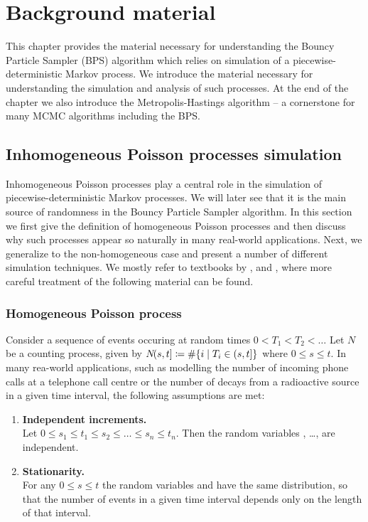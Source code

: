 \documentclass[report.tex]{subfiles}
\begin{document}
\chapter{Background material}

This chapter provides the material necessary for understanding the
Bouncy Particle Sampler (BPS) algorithm which relies on simulation of a
piecewise-deterministic Markov process.
We introduce the material necessary
for understanding the simulation and analysis of such processes.
At the end of the chapter we also introduce the Metropolis-Hastings algorithm
-- a cornerstone for many MCMC algorithms including the BPS.


\section{Inhomogeneous Poisson processes simulation}
\label{background-material-poisson-processes}


Inhomogeneous Poisson processes play a central role in the simulation of
piecewise-deterministic Markov processes. We will later see that it is
the main source of randomness in the Bouncy Particle Sampler algorithm.
In this section we first give the definition of homogeneous Poisson processes
and then discuss why such processes appear so naturally in many real-world applications.
Next, we generalize to the non-homogeneous case and present a number of different
simulation techniques.
We mostly refer to textbooks by
\citet{devroye2013non},
\citet{feller1968Introduction} and
\citet{ross1996stochastic},
where more careful treatment of the following material can be found.

\subsection{Homogeneous Poisson process}

Consider a sequence of events occuring at random times
$0 < T_{1} < T_{2} < \dots$ Let $N$ be a counting process, given by
${N}\!({s},{t}] \coloneqq \# \{ i \mid T_{i} \in (s, t] \}$ where
$0 \leq s \leq t$.
In many rea-world applications, such as modelling the number of incoming
phone calls at a telephone call centre or the number of decays from a
radioactive source in a given time interval, the following assumptions are met:

\begin{enumerate}
  \item \textbf{Independent increments.} \\
  Let $0 \leq s_{1} \leq t_{1} \leq s_{2} \leq \dots \leq s_{n} \leq t_{n}$.
  Then the random variables
  , \dots, 
  are independent.

  \item \textbf{Stationarity.} \\
  For any $0 \leq s \leq t$ the random variables
   and 
  have the same distribution, so that the number of events in a given time
  interval depends only on the length of that interval.
\end{enumerate}
\end{document}
